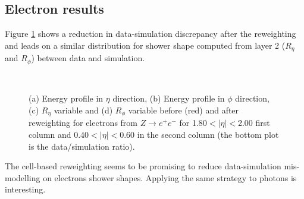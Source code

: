 \subsection{Electron results}
Figure \ref{fig:gamma:ss:reweighting:electron} shows a reduction in data-simulation discrepancy after the reweighting and leads on a similar distribution for shower shape computed from layer 2 ($R_{\eta}$ and $R_{\phi}$) between data and simulation.
\begin{figure}[htbp]
    \centering
     \\
    \caption{(a) Energy profile in $\eta$ direction, (b) Energy profile in $\phi$ direction, (c) $R_{\eta}$ variable and (d) $R_{\phi}$ variable before (red) and after reweighting for electrons from $Z\rightarrow e^+e^-$ for 1.80$<|\eta|<$2.00 first column and 0.40$<|\eta|<$0.60 in the second column (the bottom plot is the data/simulation ratio).}
    \label{fig:gamma:ss:reweighting:electron}
\end{figure}
The cell-based reweighting seems to be promising to reduce data-simulation mis-modelling on electrons shower shapes. Applying the same strategy to photons is interesting. 

